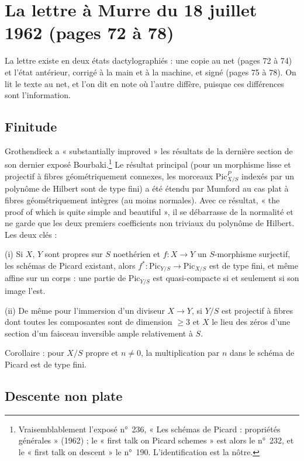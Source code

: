 \documentclass[11pt,a4paper]{article}
\begin{document}
\section*{La lettre à Murre du 18 juillet 1962 (pages 72 à 78)}

La lettre existe en deux états dactylographiés : une copie au net (pages 72 à
74) et l'état antérieur, corrigé à la main et à la machine, et signé (pages 75
à 78). On lit le texte au net, et l'on dit en note où l'autre diffère, puisque
ces différences sont l'information.

\subsection*{Finitude}

Grothendieck a « substantially improved » les résultats de la dernière section
de son dernier exposé Bourbaki.\footnote{Vraisemblablement l'exposé n°~236,
« Les schémas de Picard : propriétés générales » (1962) ; le « first talk on
Picard schemes » est alors le n°~232, et le « first talk on descent » le
n°~190. L'identification est la nôtre.} Le résultat principal (pour un
morphisme lisse et projectif à fibres géométriquement connexes, les morceaux
$\mathrm{Pic}^P_{X/S}$ indexés par un polynôme de Hilbert sont de type fini)
a été étendu par Mumford au cas plat à fibres géométriquement intègres (au
moins normales). Avec ce résultat, « the proof of which is quite simple and
beautiful », il se débarrasse de la normalité et ne garde que les deux premiers
coefficients non triviaux du polynôme de Hilbert. Les deux clés :

(i) Si $X$, $Y$ sont propres sur $S$ noethérien et $f \colon X \to Y$ un
$S$-morphisme surjectif, les schémas de Picard existant, alors
$f^* \colon \mathrm{Pic}_{Y/S} \to \mathrm{Pic}_{X/S}$ est de type fini, et
même affine sur un corps : une partie de $\mathrm{Pic}_{Y/S}$ est
quasi-compacte si et seulement si son image l'est.

(ii) De même pour l'immersion d'un diviseur $X \to Y$, si $Y/S$ est projectif à
fibres dont toutes les composantes sont de dimension $\geq 3$ et $X$ le lieu
des zéros d'une section d'un faisceau inversible ample relativement à $S$.

Corollaire : pour $X/S$ propre et $n \neq 0$, la multiplication par $n$ dans le
schéma de Picard est de type fini.

\subsection*{Descente non plate}
\end{document}
